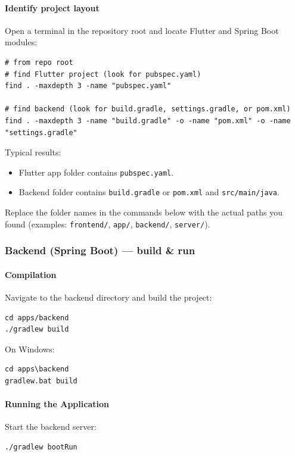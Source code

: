 \paragraph{Identify project layout}
Open a terminal in the repository root and locate Flutter and Spring Boot modules:

\begin{verbatim}
# from repo root
# find Flutter project (look for pubspec.yaml)
find . -maxdepth 3 -name "pubspec.yaml"

# find backend (look for build.gradle, settings.gradle, or pom.xml)
find . -maxdepth 3 -name "build.gradle" -o -name "pom.xml" -o -name "settings.gradle"
\end{verbatim}

Typical results:
\begin{itemize}
  \item Flutter app folder contains \texttt{pubspec.yaml}.
  \item Backend folder contains \texttt{build.gradle} or \texttt{pom.xml} and \texttt{src/main/java}.
\end{itemize}

Replace the folder names in the commands below with the actual paths you found (examples: \texttt{frontend/}, \texttt{app/}, \texttt{backend/}, \texttt{server/}).

\subsubsection{Backend (Spring Boot) — build \& run}

\paragraph{Compilation}
Navigate to the backend directory and build the project:
\begin{verbatim}
cd apps/backend
./gradlew build
\end{verbatim}

On Windows:
\begin{verbatim}
cd apps\backend
gradlew.bat build
\end{verbatim}

\paragraph{Running the Application}
Start the backend server:
\begin{verbatim}
./gradlew bootRun
\end{verbatim}

